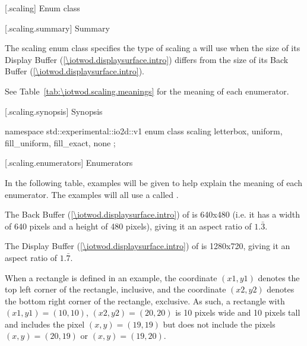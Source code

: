  [\iotwod.scaling] {Enum class }

 [\iotwod.scaling.summary] { Summary}

\pnum
The scaling enum class specifies the type of scaling a  
will use when the size of its Display Buffer (\ref{\iotwod.displaysurface.intro}) differs from the size of its Back Buffer (\ref{\iotwod.displaysurface.intro}).

\pnum
See Table~\ref{tab:\iotwod.scaling.meanings} for the meaning of each  enumerator.

 [\iotwod.scaling.synopsis] { Synopsis}

\begin{codeblock}
namespace std::experimental::io2d::v1 {
  enum class scaling {
    letterbox,
    uniform,
    fill_uniform,
    fill_exact,
    none
  };
}
\end{codeblock}

 [\iotwod.scaling.enumerators] { Enumerators}

\pnum
\begin{note}
In the following table, examples will be given to help explain the meaning of each enumerator. The examples will all use a  called .

The Back Buffer (\ref{\iotwod.displaysurface.intro}) of  is 640x480 (i.e. it has a width of 640 pixels and a height of 480 pixels), giving it an aspect ratio of $1.\bar{3}$.

The Display Buffer (\ref{\iotwod.displaysurface.intro}) of  is 1280x720, giving it an aspect ratio of $1.\bar{7}$.

When a rectangle is defined in an example, the coordinate $(x1,y1)$ denotes the top left corner of the rectangle, inclusive, and the coordinate $(x2,y2)$ denotes the bottom right corner of the rectangle, exclusive. As such, a rectangle with $(x1,y1) = (10,10)$, $(x2,y2) = (20, 20)$ is 10 pixels wide and 10 pixels tall and includes the pixel $(x,y) = (19,19)$ but does not include the pixels $(x,y) = (20,19)$ or $(x,y) = (19,20)$.
\end{note}

